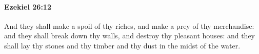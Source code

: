 
		\paragraph{Ezekiel 26:12} %
			\label{EZEKIEL-26-12}

			And they shall make a spoil of thy riches, and make a prey of thy merchandise: and they shall break down thy walls, and destroy thy pleasant houses: and they shall lay thy stones and thy timber and thy dust in the midst of the water.


